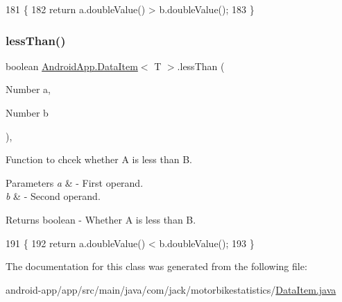 \begin{DoxyCode}
181                                                     \{
182         \textcolor{keywordflow}{return} a.doubleValue() > b.doubleValue();
183     \}
\end{DoxyCode}
\mbox{\label{class_android_app_1_1_data_item_a94d948e8d1922c116246402c633109fc}} 
\subsubsection{\texorpdfstring{less\+Than()}{lessThan()}}
{\footnotesize\ttfamily boolean \hyperlink{class_android_app_1_1_data_item}{Android\+App.\+Data\+Item}$<$ T $>$.less\+Than (\begin{DoxyParamCaption}\item[{Number}]{a,  }\item[{Number}]{b }\end{DoxyParamCaption})\hspace{0.3cm}{\ttfamily [inline]}, {\ttfamily [private]}}



Function to chcek whether A is less than B. 


\begin{DoxyParams}{Parameters}
{\em a} & -\/ First operand. \\
\hline
{\em b} & -\/ Second operand. \\
\hline
\end{DoxyParams}
\begin{DoxyReturn}{Returns}
boolean -\/ Whether A is less than B. 
\end{DoxyReturn}

\begin{DoxyCode}
191                                                  \{
192         \textcolor{keywordflow}{return} a.doubleValue() < b.doubleValue();
193     \}
\end{DoxyCode}


The documentation for this class was generated from the following file\+:\begin{DoxyCompactItemize}
\item 
android-\/app/app/src/main/java/com/jack/motorbikestatistics/\hyperlink{_data_item_8java}{Data\+Item.\+java}\end{DoxyCompactItemize}
